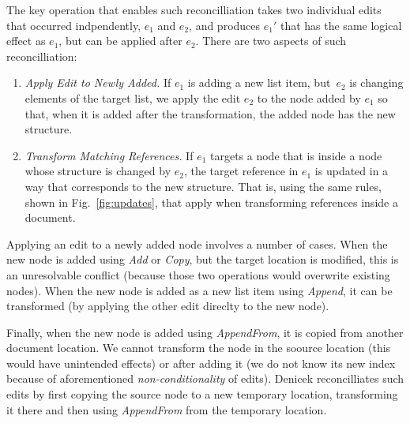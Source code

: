 \documentclass[sigconf]{acmart}
\begin{document}
The key operation that enables such reconcilliation takes two individual edits that occurred
indpendently, $e_1$ and $e_2$, and produces $e_1'$ that has the same logical effect as
$e_1$, but can be applied after $e_2$. There are two aspects of such reconcilliation:

\begin{enumerate}
\item \emph{Apply Edit to Newly Added.} If $e_1$ is adding a new list item, but~$e_2$ is
  changing elements of the target list, we apply the edit $e_2$ to the node added by $e_1$ so
  that, when it is added after the transformation, the added node has the new structure.

\item \emph{Transform Matching References.} If $e_1$ targets a node that is inside a node
  whose structure is changed by $e_2$, the target reference in $e_1$ is updated in a way that
  corresponds to the new structure. That is, using the same rules, shown in Fig.~\ref{fig:updates},
  that apply when transforming references inside a document.
\end{enumerate}

Applying an edit to a newly added node involves a number of cases. When the new node is added
using \textit{Add} or \textit{Copy}, but the target location is modified, this is an unresolvable
conflict (because those two operations would overwrite existing nodes). When the new node is
added as a new list item using \textit{Append}, it can be transformed (by applying the other
edit direclty to the new node).

Finally, when the new node is added using \textit{AppendFrom},
it is copied from another document location. We cannot transform the node in the soource location
(this would have unintended effects) or after adding it (we do not know its new index because of
aforementioned \emph{non-conditionality} of edits). Denicek reconcilliates such edits by first
copying the source node to a new temporary location, transforming it there and then using
\textit{AppendFrom} from the temporary location.


\end{document}
